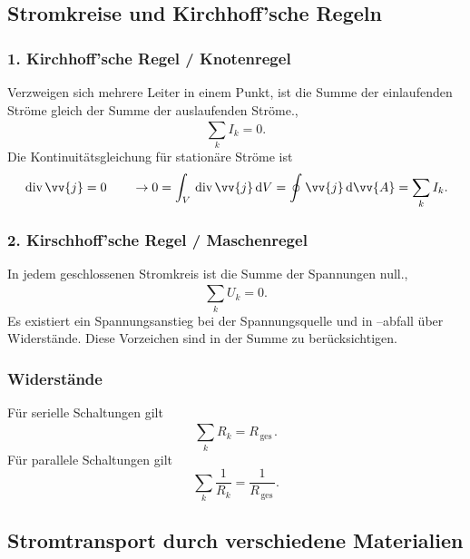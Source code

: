 \documentclass[a4paper,12pt]{article}
\newcommand{\td}{\,\text{d}}
\begin{document}
\subsection{Stromkreise und Kirchhoff'sche Regeln}
\subsubsection{1. Kirchhoff'sche Regel / Knotenregel}
\glqq Verzweigen sich mehrere Leiter in einem Punkt, ist die Summe der einlaufenden Ströme gleich der Summe der auslaufenden Ströme.\grqq{},
\[ 
        \sum_{k}^{}I_k=0
.\] 
Die Kontinuitätsgleichung für stationäre Ströme ist
\[ 
        \,\text{div}\,\vv{j}=0\qquad \rightarrow 0=\int_{V}^{}\,\text{div}\,\vv{j}\td V=\oint_{}^{}\vv{j}\td \vv{A}=\sum_{k}^{}I_k
.\] 

\subsubsection{2. Kirschhoff'sche Regel / Maschenregel}
\glqq In jedem geschlossenen Stromkreis ist die Summe der Spannungen null.\grqq{},
\[ 
        \sum_{k}^{}U_k=0
.\]
Es existiert ein Spannungsanstieg bei der Spannungsquelle und in --abfall über Widerstände. Diese Vorzeichen sind in der Summe zu berücksichtigen.

\subsubsection{Widerstände}
Für serielle Schaltungen gilt
\[ 
        \sum_{k}^{}R_k=R_{\,\text{ges}\,}
.\] 
Für parallele Schaltungen gilt
\[ 
        \sum_{k}^{}\dfrac{1}{R_k}=\dfrac{1}{R_{\,\text{ges}\,}}
.\] 

\subsection{Stromtransport durch verschiedene Materialien}
\end{document}
